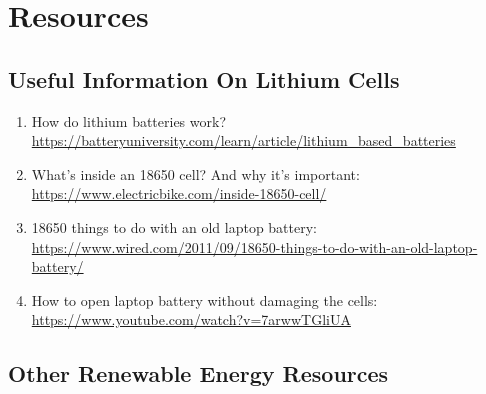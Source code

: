 \documentclass{article}
\theoremstyle{definition}
\theoremstyle{definition}
\theoremstyle{remark}
\begin{document}
\section{Resources} %
\label{sec:resources}

  \subsection{Useful Information On Lithium Cells} %
  \label{sub:useful_information_on_lithium_cells}

    \begin{enumerate}
      \item How do lithium batteries work? \newline
        \url{https://batteryuniversity.com/learn/article/lithium_based_batteries}
      \item What’s inside an 18650 cell? And why it’s important: \newline
        \url{https://www.electricbike.com/inside-18650-cell/}
      \item 18650 things to do with an old laptop battery: \newline
        \url{https://www.wired.com/2011/09/18650-things-to-do-with-an-old-laptop-battery/}
      \item How to open laptop battery without damaging the cells: \newline
        \url{https://www.youtube.com/watch?v=7arwwTGliUA}
    \end{enumerate}
  

  \subsection{Other Renewable Energy Resources} %
  \label{sub:other_renewable_energy_resources}
\end{document}

